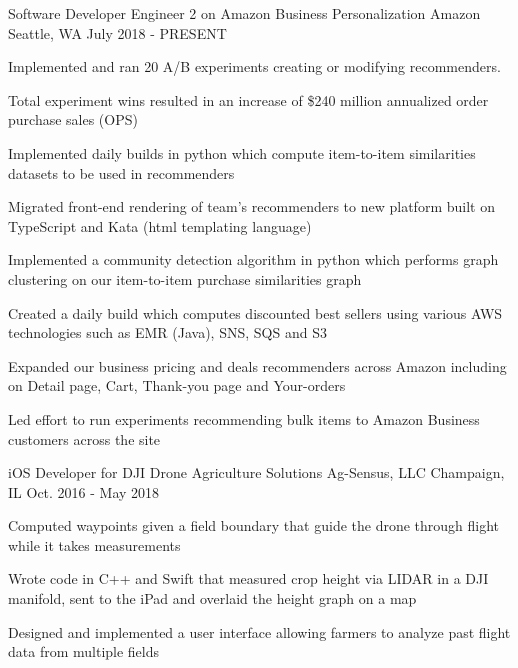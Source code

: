 

\begin{cventries}

  \cventry
    {Software Developer Engineer 2 on Amazon Business Personalization} %
    {Amazon} %
    {Seattle, WA} %
    {July 2018 - PRESENT} %
    {
      \begin{cvitems} %
        \item {Implemented and ran 20 A/B experiments creating or modifying recommenders.}
        \item {Total experiment wins resulted in an increase of \$240 million annualized order purchase sales (OPS)}
        \item {Implemented daily builds in python which compute item-to-item similarities datasets to be used in recommenders}
        \item {Migrated front-end rendering of team's recommenders to new platform built on TypeScript and Kata (html templating language)}
        \item {Implemented a community detection algorithm in python which performs graph clustering on our item-to-item purchase similarities graph}
        \item {Created a daily build which computes discounted best sellers using various AWS technologies such as EMR (Java), SNS, SQS and S3}
        \item {Expanded our business pricing and deals recommenders across Amazon including on Detail page, Cart, Thank-you page and Your-orders}
        \item {Led effort to run experiments recommending bulk items to Amazon Business customers across the site}
      \end{cvitems}
    }

  \cventry
    {iOS Developer for DJI Drone Agriculture Solutions} %
    {Ag-Sensus, LLC} %
    {Champaign, IL} %
    {Oct. 2016 - May 2018} %
    {
      \begin{cvitems} %
        \item {Computed waypoints given a field boundary that guide the drone through flight while it takes measurements}
        \item {Wrote code in C++ and Swift that measured crop height via LIDAR in a DJI manifold, sent to the iPad and overlaid the height graph on a map}
        \item {Designed and implemented a user interface allowing farmers to analyze past flight data from multiple fields}
      \end{cvitems}
    }


\end{cventries}
